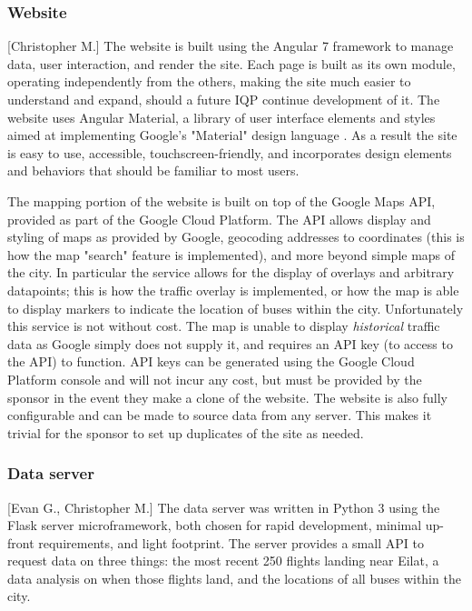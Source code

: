 \documentclass[12pt]{article}                       %
\begin{document}
\subsubsection{Website}[Christopher M.]
The website is built using the Angular 7 framework to manage data, user interaction, and render the site. Each page is built as its own module, operating independently from the others, making the site much easier to understand and expand, should a future IQP continue development of it. The website uses Angular Material, a library of user interface elements and styles aimed at implementing Google's "Material" design language \cite{2019AngularMaterial}. As a result the site is easy to use, accessible, touchscreen-friendly, and incorporates design elements and behaviors that should be familiar to most users.

The mapping portion of the website is built on top of the Google Maps API, provided as part of the Google Cloud Platform. The API allows display and styling of maps as provided by Google, geocoding addresses to coordinates (this is how the map "search" feature is implemented), and more beyond simple maps of the city. In particular the service allows for the display of overlays and arbitrary datapoints; this is how the traffic overlay is implemented, or how the map is able to display markers to indicate the location of buses within the city. Unfortunately this service is not without cost. The map is unable to display \textit{historical} traffic data as Google simply does not supply it, and requires an API key (to access to the API) to function. API keys can be generated using the Google Cloud Platform console and will not incur any cost, but must be provided by the sponsor in the event they make a clone of the website. The website is also fully configurable and can be made to source data from any server. This makes it trivial for the sponsor to set up duplicates of the site as needed.

\subsubsection{Data server}[Evan G., Christopher M.] \label{sec:data_server}
The data server was written in Python 3 using the Flask server microframework, both chosen for rapid development, minimal up-front requirements, and light footprint. The server provides a small API to request data on three things: the most recent 250 flights landing near Eilat, a data analysis on when those flights land, and the locations of all buses within the city.
\end{document}
